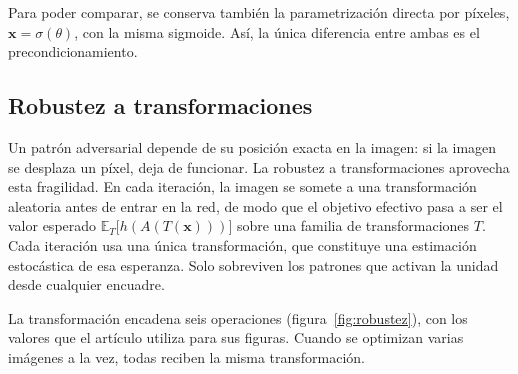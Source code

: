 \documentclass[11pt,a4paper]{article}
\newcommand{\vx}{\mathbf{x}}
\begin{document}
Para poder comparar, se conserva también la parametrización directa por
píxeles, $\vx = \sigma(\theta)$, con la misma sigmoide. Así, la única
diferencia entre ambas es el precondicionamiento.

\subsection{Robustez a transformaciones}
\label{sec:robustez}

Un patrón adversarial depende de su posición exacta en la imagen: si la
imagen se desplaza un píxel, deja de funcionar. La robustez a
transformaciones aprovecha esta fragilidad. En cada iteración, la imagen se
somete a una transformación aleatoria antes de entrar en la red, de modo que
el objetivo efectivo pasa a ser el valor esperado
$\mathbb{E}_{T}\bigl[h(A(T(\vx)))\bigr]$ sobre una familia de
transformaciones $T$. Cada iteración usa una única transformación, que
constituye una estimación estocástica de esa esperanza. Solo sobreviven los
patrones que activan la unidad desde cualquier encuadre.

La transformación encadena seis operaciones (figura~\ref{fig:robustez}),
con los valores que el artículo utiliza para sus figuras. Cuando se
optimizan varias imágenes a la vez, todas reciben la misma transformación.
\end{document}
